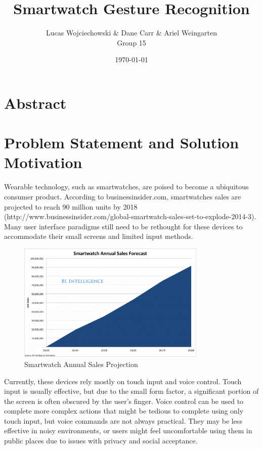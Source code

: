 \documentclass{report}
\title{Smartwatch Gesture Recognition}
\date{\today}
\author{
  Lucas Wojciechowski \& Dane Carr \& Ariel Weingarten \\
  Group 15
}
\begin{document}
\maketitle


\section{Abstract}


\section{Problem Statement and Solution Motivation}
Wearable technology, such as smartwatches, are poised to become a ubiquitous consumer product. According to businessinsider.com, smartwatches sales are projected to reach 90 million units by 2018 (http://www.businessinsider.com/global-smartwatch-sales-set-to-explode-2014-3). Many user interface paradigms still need to be rethought for these devices to accommodate their small screens and limited input methods. 

\begin{figure}[ht!]
  \centering
  \includegraphics[width=90mm]{smartwatch.png}
  \caption{Smartwatch Annual Sales Projection \label{overflow}}
\end{figure}

Currently, these devices rely mostly on touch input and voice control. Touch input is usually effective, but due to the small form factor, a significant portion of the screen is often obscured by the user's finger. Voice control can be used to complete more complex actions that might be tedious to complete using only touch input, but voice commands are not always practical. They may be less effective in noisy environments, or users might feel uncomfortable using them in public places due to issues with privacy and social acceptance.
\end{document}
